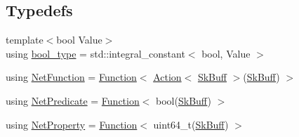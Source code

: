 \subsection*{Typedefs}
\begin{DoxyCompactItemize}
\item 
{\footnotesize template$<$bool Value$>$ }\\using \hyperlink{namespacepfq__lang_a66ac99ea626e7d1994f42ebfa003fbff}{bool\+\_\+type} = std\+::integral\+\_\+constant$<$ bool, Value $>$
\item 
using \hyperlink{namespacepfq__lang_a63dfceff54d39223bbfe7dbc9616c643}{Net\+Function} = \hyperlink{structpfq__lang_1_1Function}{Function}$<$ \hyperlink{structpfq__lang_1_1Action}{Action}$<$ \hyperlink{structpfq__lang_1_1SkBuff}{Sk\+Buff} $>$(\hyperlink{structpfq__lang_1_1SkBuff}{Sk\+Buff}) $>$
\item 
using \hyperlink{namespacepfq__lang_a7f62267862cd6049344078744cbcde3b}{Net\+Predicate} = \hyperlink{structpfq__lang_1_1Function}{Function}$<$ bool(\hyperlink{structpfq__lang_1_1SkBuff}{Sk\+Buff}) $>$
\item 
using \hyperlink{namespacepfq__lang_aedb71fd680cdb670390e8fac13a7cb5e}{Net\+Property} = \hyperlink{structpfq__lang_1_1Function}{Function}$<$ uint64\+\_\+t(\hyperlink{structpfq__lang_1_1SkBuff}{Sk\+Buff}) $>$
\end{DoxyCompactItemize}
